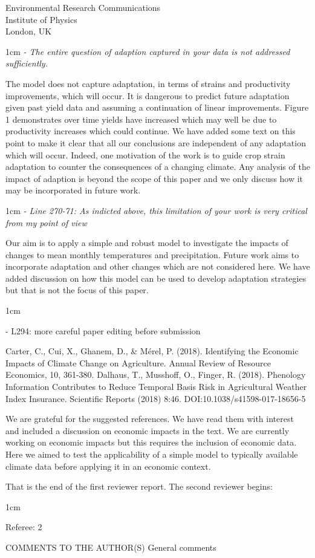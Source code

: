 \documentclass{letter}
\newcommand{\review}[1]{   
    \begin{adjustwidth}{1cm}{}
    \em{#1}
    \end{adjustwidth}
    }
\begin{document}
\begin{letter}{Environmental Research Communications \\ Institute of Physics \\ London, UK}
\review{
- The entire question of adaption captured in your data is not addressed sufficiently.
}

The model does not capture adaptation, in terms of strains and productivity improvements, which will occur. It is dangerous to predict future adaptation given past yield data and assuming a continuation of linear improvements. Figure 1 demonstrates over time yields have increased which may well be due to productivity increases which could continue. We have added some text on this point to make it clear that all our conclusions are independent of any adaptation which will occur. Indeed, one motivation of the work is to guide crop strain adaptation to counter the consequences of a changing climate. Any analysis of the impact of adaption is beyond the scope of this paper and we only discuss how it may be incorporated in future work.

\review{
- Line 270-71: As indicted above, this limitation of your work is very critical from my point of view
}

Our aim is to apply a simple and robust model to investigate the impacts of changes to mean monthly temperatures and precipitation. Future work aims to incorporate adaptation and other changes which are not considered here. We have added discussion on how this model can be used to develop adaptation strategies but that is not the focus of this paper.

\review{
- L294: more careful paper editing before submission

Carter, C., Cui, X., Ghanem, D., & Mérel, P. (2018). Identifying the Economic Impacts of Climate Change on Agriculture. Annual Review of Resource Economics, 10, 361-380.
Dalhaus, T., Musshoff, O., Finger, R. (2018). Phenology Information Contributes to Reduce Temporal Basis Risk in Agricultural Weather Index Insurance. Scientific Reports (2018) 8:46. DOI:10.1038/s41598-017-18656-5
}

We are grateful for the suggested references. We have read them with interest and included a discussion on economic impacts in the text. We are currently working on economic impacts but this requires the inclusion of economic data. Here we aimed to test the applicability of a simple model to typically available climate data before applying it in an economic context. 

That is the end of the first reviewer report. The second reviewer begins:

\review{
Referee: 2

COMMENTS TO THE AUTHOR(S)
General comments

}
\end{letter}
\end{document}
